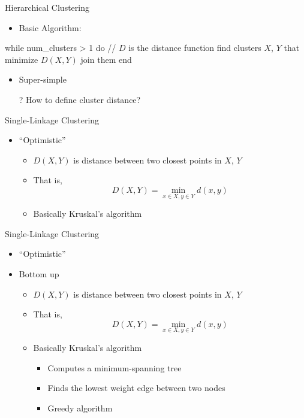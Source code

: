 \documentclass[aspectratio=169]{beamer}
\begin{document}
\begin{frame}[fragile]{Hierarchical Clustering}

\begin{itemize}
\item Basic Algorithm:
\end{itemize}

\begin{SQL}
while num_clusters > 1 do
  // $D$ is the distance function
  find clusters $X$, $Y$ that minimize $D(X, Y)$
  join them
end
\end{SQL}

\begin{itemize}
\item Super-simple
\item[?] How to define cluster distance?
\end{itemize}

\end{frame}
\begin{frame}{Single-Linkage Clustering}

\begin{itemize}
\item ``Optimistic''
\begin{itemize}
	\item $D(X, Y)$ is distance between two closest points in $X$, $Y$
	\item That is, 
	$$D(X, Y) = \min_{x \in X, y \in Y} d(x, y)$$
	\item Basically Kruskal's algorithm
\end{itemize}
\end{itemize}
\end{frame}
\begin{frame}[fragile]{Single-Linkage Clustering}

\begin{itemize}
\item ``Optimistic''
\item Bottom up
\begin{itemize}
	\item $D(X, Y)$ is distance between two closest points in $X$, $Y$
	\item That is, 
	$$D(X, Y) = \min_{x \in X, y \in Y} d(x, y)$$
	\item Basically Kruskal's algorithm 
	\begin{itemize}
	\item Computes a minimum-spanning tree
	\item Finds the lowest weight edge between two nodes
	\item Greedy algorithm
	\end{itemize}
\end{itemize}
\end{itemize}

\end{frame}
\end{document}
